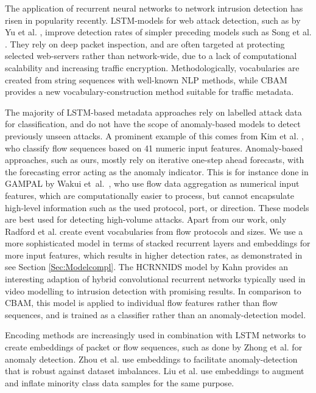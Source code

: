 The application of recurrent neural networks to network intrusion detection has risen in popularity recently. LSTM-models for web attack detection, such as by Yu et al. \cite{yu2018attention}, improve detection rates of simpler preceding models such as Song et al. \cite{song2009spectrogram}. They rely on deep packet inspection, and are often targeted at protecting selected web-servers rather than network-wide, due to a lack of computational scalability and increasing traffic encryption. Methodologically, vocabularies are created from string sequences with well-known NLP methods, while CBAM provides a new vocabulary-construction method suitable for traffic metadata.

The majority of LSTM-based metadata approaches rely on labelled attack data for classification, and do not have the scope of anomaly-based models to detect previously unseen attacks. %
A prominent example of this comes from Kim et al. \cite{kim2016long}, who classify flow sequences based on 41 numeric input features. %
Anomaly-based approaches, such as ours, mostly rely on iterative one-step ahead forecasts, with the forecasting error acting as the anomaly indicator. This is for instance done in GAMPAL by Wakui et~al.~\cite{wakui2019gampal}, who use flow data aggregation  as numerical input features, which are computationally easier to process, but cannot encapsulate high-level information such as the used protocol, port, or direction. These models are best used for detecting high-volume attacks.
Apart from our work, only Radford et al. \cite{radford2018network} create event vocabularies from flow protocols and sizes. We use a more sophisticated model in terms of stacked recurrent layers and embeddings for more input features, which results in higher detection rates, as demonstrated in see Section \ref{Sec:Modelcompl}. The HCRNNIDS model by Kahn provides an interesting adaption of hybrid convolutional recurrent networks typically used in video modelling to intrusion detection \cite{khan2021hcrnnids} with promising results. In comparison to CBAM, this model is applied to individual flow features rather than flow sequences, and is trained as a classifier rather than an anomaly-detection model.  

Encoding methods are increasingly used in combination with LSTM networks to create embeddings of packet or flow sequences, such as done by Zhong et al. \cite{zhong2020helad} for anomaly detection. Zhou et al. \cite{zhou2020variational} use embeddings to facilitate anomaly-detection that is robust against dataset imbalances. Liu et al. \cite{liu2020intrusion} use embeddings to augment and inflate minority class data samples for the same purpose. 

